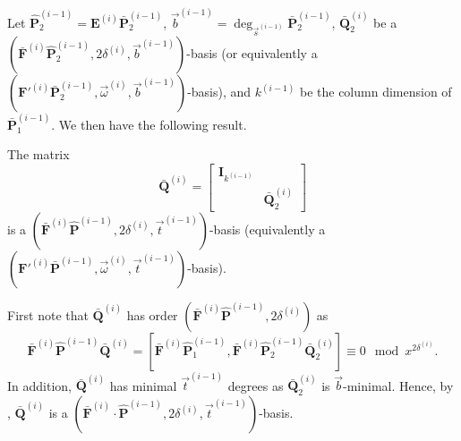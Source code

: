 Let $\hat{\mathbf{P}}_{2}^{\left(i-1\right)}=\mathbf{E}^{\left(i\right)}\bar{\mathbf{P}}_{2}^{\left(i-1\right)}$,
$\vec{b}^{\left(i-1\right)}=\deg_{\vec{s}^{\left(i-1\right)}}\bar{\mathbf{P}}_{2}^{\left(i-1\right)}$,
$\bar{\mathbf{Q}}_{2}^{\left(i\right)}$ be a $(\bar{\mathbf{F}}^{\left(i\right)}\hat{\mathbf{P}}_{2}^{\left(i-1\right)},2\delta^{\left(i\right)},\vec{b}^{\left(i-1\right)})$-basis
(or equivalently a $(\mathbf{F}'^{\left(i\right)}\bar{\mathbf{P}}_{2}^{\left(i-1\right)},\vec{\omega}^{\left(i\right)},\vec{b}^{\left(i-1\right)})$-basis),
and $k^{\left(i-1\right)}$ be the column dimension of $\bar{\mathbf{P}}_{1}^{\left(i-1\right)}$.
We then have the following result.
\begin{lem}
\label{lem:disregardComputedBasisElements} The matrix \[
\bar{\mathbf{Q}}^{\left(i\right)}=\left[\begin{array}{cc}
\mathbf{I}_{k^{\left(i-1\right)}}\\
 & \bar{\mathbf{Q}}_{2}^{\left(i\right)}\end{array}\right]\]
 is a $(\bar{\mathbf{F}}^{\left(i\right)}\hat{\mathbf{P}}^{\left(i-1\right)},2\delta^{\left(i\right)},\vec{t}^{\left(i-1\right)})$-basis
(equivalently a $(\mathbf{F}'^{\left(i\right)}\bar{\mathbf{P}}^{\left(i-1\right)},\vec{\omega}^{\left(i\right)},\vec{t}^{\left(i-1\right)})$-basis).\end{lem}
\begin{pf}
First note that $\bar{\mathbf{Q}}^{\left(i\right)}$ has order $(\bar{\mathbf{F}}^{\left(i\right)}\hat{\mathbf{P}}^{\left(i-1\right)},2\delta^{\left(i\right)})$
as \[
\bar{\mathbf{F}}^{\left(i\right)}\hat{\mathbf{P}}^{\left(i-1\right)}\bar{\mathbf{Q}}^{\left(i\right)}=[\bar{\mathbf{F}}^{\left(i\right)}\hat{\mathbf{P}}_{1}^{\left(i-1\right)},\bar{\mathbf{F}}^{\left(i\right)}\hat{\mathbf{P}}_{2}^{\left(i-1\right)}\bar{\mathbf{Q}}_{2}^{\left(i\right)}]\equiv0\mod x^{2\delta^{\left(i\right)}}.\]
 In addition, $\bar{\mathbf{Q}}^{\left(i\right)}$ has minimal $\vec{t}^{\left(i-1\right)}$
degrees as $\bar{\mathbf{Q}}_{2}^{\left(i\right)}$ is $\vec{b}$-minimal.
Hence, by , 
$\bar{\mathbf{Q}}^{\left(i\right)}$ is a 
$(\bar{\mathbf{F}}^{\left(i\right)}\cdot\hat{\mathbf{P}}^{\left(i-1\right)},2\delta^{\left(i\right)},\vec{t}^{\left(i-1\right)})$-basis.
\end{pf}
%
\begin{comment}
Alternatively, one can also argue that since $\hat{\mathbf{P}}_{1}^{\left(i-1\right)}$
already has order $(\bar{\mathbf{F}}^{\left(i\right)},2\delta^{\left(i\right)})$,
it cannot contribute in any way to and cannot be affected in any way
by the computations of a $(\bar{\mathbf{F}}^{\left(i\right)}\hat{\mathbf{P}}^{\left(i-1\right)},2\delta^{\left(i\right)},\vec{b}^{\left(i-1\right)})$-basis,
hence it is sufficient to just use $\bar{\mathbf{F}}^{\left(i\right)}\hat{\mathbf{P}}_{2}^{\left(i-1\right)}$
to compute a $(\bar{\mathbf{F}}^{\left(i\right)}\cdot\hat{\mathbf{P}}_{2}^{\left(i-1\right)},2\delta^{\left(i\right)},\vec{b}^{\left(i-1\right)})$-basis. 
\end{comment}
{}


